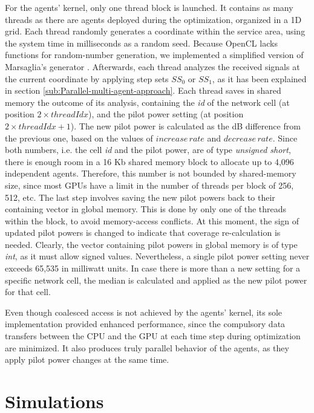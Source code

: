 For the agents' kernel, only one thread block is launched. It contains
as many threads as there are agents deployed during the optimization,
organized in a 1D grid. Each thread randomly generates a coordinate
within the service area, using the system time in milliseconds as
a random seed. Because OpenCL lacks functions for random-number generation,
we implemented a simplified version of Marsaglia's generator \cite{Marsaglia_Seeds.for.random.number.generator:2003}.
Afterwards, each thread analyzes the received signals at the current
coordinate by applying step sets \textit{$SS_{0}$} or \textit{$SS_{1}$},
as it has been explained in section \ref{sub:Parallel-multi-agent-approach}.
Each thread saves in shared memory the outcome of its analysis, containing
the \emph{id} of the network cell (at position $2\times threadIdx$),
and the pilot power setting (at position $2\times threadIdx+1$).
The new pilot power is calculated as the dB difference from the previous
one, based on the values of $increase\, rate$ and $decrease\, rate$.
Since both numbers, i.e. the cell \emph{id} and the pilot power, are
of type \emph{unsigned short}, there is enough room in a 16 Kb shared
memory block to allocate up to 4,096 independent agents. Therefore,
this number is not bounded by shared-memory size, since most GPUs
have a limit in the number of threads per block of 256, 512, etc.
The last step involves saving the new pilot powers back to their containing
vector in global memory. This is done by only one of the threads within
the block, to avoid memory-access conflicts. At this moment, the sign
of updated pilot powers is changed to indicate that coverage re-calculation
is needed. Clearly, the vector containing pilot powers in global memory
is of type \emph{int}, as it must allow signed values. Nevertheless,
a single pilot power setting never exceeds 65,535 in milliwatt units.
In case there is more than a new setting for a specific network cell,
the median is calculated and applied as the new pilot power for that
cell.

Even though coalesced access is not achieved by the agents' kernel,
its sole implementation provided enhanced performance, since the compulsory
data transfers between the CPU and the GPU at each time step during
optimization are minimized. It also produces truly parallel behavior
of the agents, as they apply pilot power changes at the same time.


\section{Simulations}


